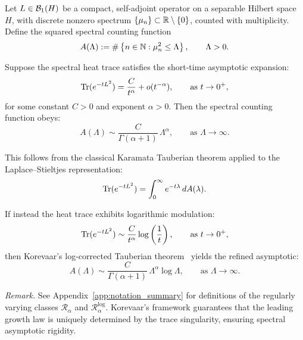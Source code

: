 \begin{definition}
\label{def:tauberian_theorem}

Let \( L \in \mathcal{B}_1(H) \) be a compact, self-adjoint operator on a separable Hilbert space \( H \), with discrete nonzero spectrum \( \{ \mu_n \} \subset \mathbb{R} \setminus \{0\} \), counted with multiplicity. Define the squared spectral counting function
\[
A(\Lambda) := \#\left\{ n \in \mathbb{N} : \mu_n^2 \le \Lambda \right\}, \qquad \Lambda > 0.
\]

Suppose the spectral heat trace satisfies the short-time asymptotic expansion:
\[
\operatorname{Tr}(e^{-t L^2}) = \frac{C}{t^\alpha} + o(t^{-\alpha}), \qquad \text{as } t \to 0^+,
\]
for some constant \( C > 0 \) and exponent \( \alpha > 0 \). Then the spectral counting function obeys:
\[
A(\Lambda) \sim \frac{C}{\Gamma(\alpha + 1)} \, \Lambda^\alpha, \qquad \text{as } \Lambda \to \infty.
\]

This follows from the classical Karamata Tauberian theorem applied to the Laplace–Stieltjes representation:
\[
\operatorname{Tr}(e^{-t L^2}) = \int_0^\infty e^{-t \lambda} \, dA(\lambda).
\]

\medskip

If instead the heat trace exhibits logarithmic modulation:
\[
\operatorname{Tr}(e^{-t L^2}) \sim \frac{C}{t^\alpha} \log\left( \frac{1}{t} \right), \qquad \text{as } t \to 0^+,
\]
then Korevaar’s log-corrected Tauberian theorem~\cite[Ch.~III, §5]{Korevaar2004Tauberian} yields the refined asymptotic:
\[
A(\Lambda) \sim \frac{C}{\Gamma(\alpha + 1)} \, \Lambda^\alpha \log \Lambda, \qquad \text{as } \Lambda \to \infty.
\]

\medskip

\noindent
\emph{Remark.} See Appendix~\ref{app:notation_summary} for definitions of the regularly varying classes \( \mathcal{R}_\alpha \) and \( \mathcal{R}_\alpha^{\log} \). Korevaar’s framework guarantees that the leading growth law is uniquely determined by the trace singularity, ensuring spectral asymptotic rigidity.
\end{definition}
